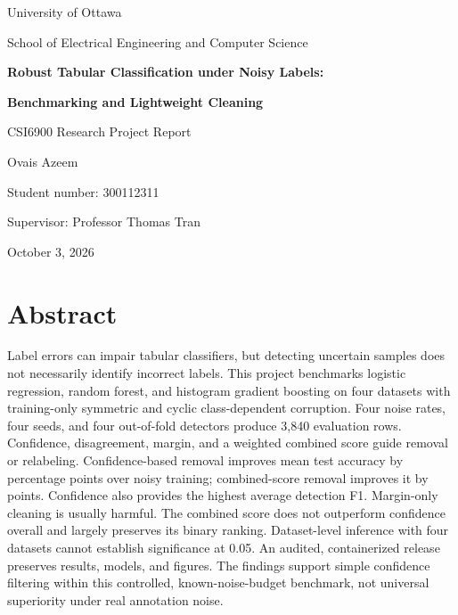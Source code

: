 \documentclass[11pt,letterpaper,oneside]{report}
\begin{document}
\begin{titlepage}
\centering
{\large University of Ottawa\par}
{\large School of Electrical Engineering and Computer Science\par}
\vspace{1.5cm}
{\LARGE\bfseries Robust Tabular Classification under Noisy Labels:\par}
\vspace{0.4cm}
{\LARGE\bfseries Benchmarking and Lightweight Cleaning\par}
\vspace{1.4cm}
{\Large CSI6900 Research Project Report\par}
\vspace{1cm}
{\large Ovais Azeem\par}
{\large Student number: 300112311\par}
\vspace{0.8cm}
{\large Supervisor: Professor Thomas Tran\par}
\vfill
{\large October 3, 2026\par}
\end{titlepage}
\chapter*{Abstract}
Label errors can impair tabular classifiers, but detecting uncertain samples
does not necessarily identify incorrect labels. This project benchmarks
logistic regression, random forest, and histogram gradient boosting on four
datasets with training-only symmetric and cyclic class-dependent corruption.
Four noise rates, four seeds, and four out-of-fold detectors produce 3,840
evaluation rows. Confidence, disagreement, margin, and a weighted combined
score guide removal or relabeling. Confidence-based removal improves mean
test accuracy by \ConfidenceRemoveGain{} percentage points over noisy training;
combined-score removal improves it by \CombinedRemoveGain{} points.
Confidence also provides the highest average detection F1. Margin-only
cleaning is usually harmful. The combined score does not outperform
confidence overall and largely preserves its binary ranking. Dataset-level
inference with four datasets cannot establish significance at 0.05.
An audited, containerized release preserves results, models, and figures.
The findings support simple confidence filtering within this controlled,
known-noise-budget benchmark, not universal superiority under real annotation noise.
\tableofcontents
\listoftables
\listoffigures
\clearpage
{}






\clearpage
{}
{}


\appendix

\end{document}
